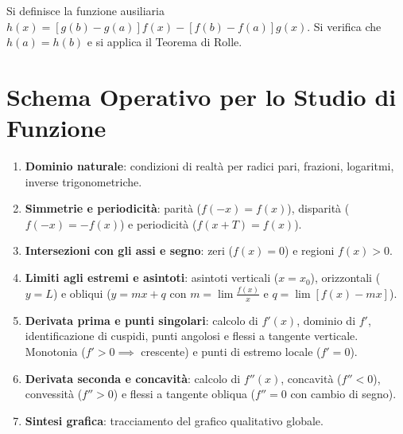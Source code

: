 \begin{dimostrazione}
Si definisce la funzione ausiliaria $h(x) = [g(b) - g(a)]f(x) - [f(b) - f(a)]g(x)$. Si verifica che $h(a) = h(b)$ e si applica il Teorema di Rolle.
\end{dimostrazione}

\section{Schema Operativo per lo Studio di Funzione}
\label{sec:schema_studio_funzione}

\begin{metodo}
\begin{enumerate}
    \item \textbf{Dominio naturale}: condizioni di realtà per radici pari, frazioni, logaritmi, inverse trigonometriche.
    \item \textbf{Simmetrie e periodicità}: parità ($f(-x) = f(x)$), disparità ($f(-x) = -f(x)$) e periodicità ($f(x+T) = f(x)$).
    \item \textbf{Intersezioni con gli assi e segno}: zeri ($f(x) = 0$) e regioni $f(x) > 0$.
    \item \textbf{Limiti agli estremi e asintoti}: asintoti verticali ($x = x_0$), orizzontali ($y = L$) e obliqui ($y = mx + q$ con $m = \lim \frac{f(x)}{x}$ e $q = \lim [f(x) - mx]$).
    \item \textbf{Derivata prima e punti singolari}: calcolo di $f'(x)$, dominio di $f'$, identificazione di cuspidi, punti angolosi e flessi a tangente verticale. Monotonia ($f' > 0 \implies$ crescente) e punti di estremo locale ($f' = 0$).
    \item \textbf{Derivata seconda e concavità}: calcolo di $f''(x)$, concavità ($f'' < 0$), convessità ($f'' > 0$) e flessi a tangente obliqua ($f'' = 0$ con cambio di segno).
    \item \textbf{Sintesi grafica}: tracciamento del grafico qualitativo globale.
\end{enumerate}
\end{metodo}
